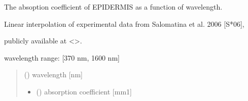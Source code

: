 \documentclass[letterpaper,10pt,english]{sphinxmanual}
\begin{document}
\begin{fulllineitems}
\label{\detokenize{03_absorption_coefficient:skinoptics.absorption_coefficient.mua_EP_Salomatina}}
\pysigstartsignatures
{}
\pysigstopsignatures
\begin{DUlineblock}{0em}
\item[] The absoption coefficient of EPIDERMIS as a function of wavelength.
\item[] Linear interpolation of experimental data from Salomatina et al. 2006 {[}S*06{]},
\item[] publicly available at \textless{}\textgreater{}.
\end{DUlineblock}

\begin{DUlineblock}{0em}
\item[] wavelength range: {[}370 nm, 1600 nm{]}
\end{DUlineblock}
\begin{quote}\begin{description}
\sphinxAtStartPar
{} () \textendash{} wavelength {[}nm{]}

\sphinxAtStartPar
\begin{itemize}
\item {} 
\sphinxAtStartPar
{} () \textendash{} absorption coefficient {[}mm\sphinxhyphen{}1{]}

\end{itemize}


\end{description}\end{quote}

\end{fulllineitems}

\end{document}
